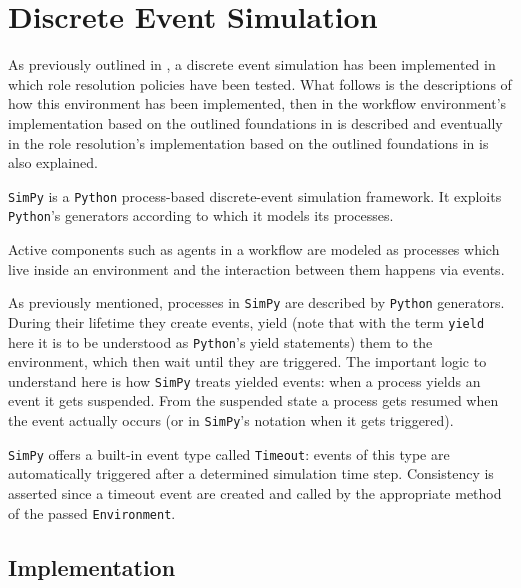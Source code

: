 \chapter{Discrete Event Simulation}
\label{ch:discrete_event_sim}

As previously outlined in , a discrete event simulation has been implemented in which role resolution policies have been tested. What follows is the descriptions of how this environment has been implemented, then in  the workflow environment's implementation based on the outlined foundations in  is described and eventually in  the role resolution's implementation based on the outlined foundations in  is also explained.

\texttt{SimPy} is a \texttt{Python} process-based discrete-event simulation framework. It exploits \texttt{Python}'s generators according to which it models its processes.

Active components such as agents in a workflow are modeled as processes which live inside an environment and the interaction between them happens via events.

As previously mentioned, processes in \texttt{SimPy} are described by \texttt{Python} generators. During their lifetime they create events, yield (note that with the term \texttt{yield} here it is to be understood as \texttt{Python}'s yield statements) them to the environment, which then wait until they are triggered. The important logic to understand here is how \texttt{SimPy} treats yielded events: when a process yields an event it gets suspended. From the suspended state a process gets resumed when the event actually occurs (or in \texttt{SimPy}'s notation when it gets triggered).

\texttt{SimPy} offers a built-in event type called \texttt{Timeout}: events of this type are automatically triggered after a determined simulation time step. Consistency is asserted since a timeout event are created and called by the appropriate method of the passed \texttt{Environment}.

\section{ Implementation}
\label{sec:wfms_implementation}

